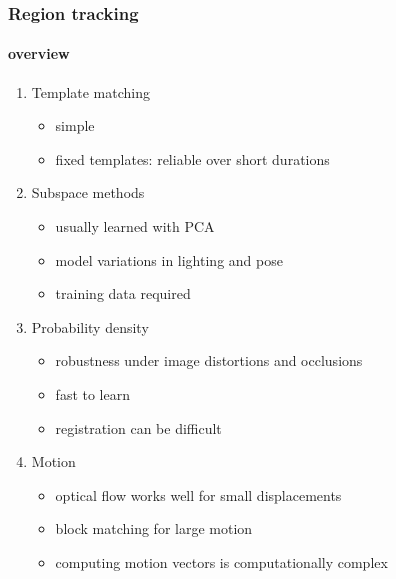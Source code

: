 \begin{frame}
\frametitle{Region tracking}
\framesubtitle{overview}
\mypagenum
	\begin{enumerate}
		\item Template matching
			\begin{itemize}
				\item simple
				\item fixed templates: reliable over short durations 
			\end{itemize}
		\item Subspace methods
			\begin{itemize}
				\item usually learned with PCA
				\item model variations in lighting and pose
				\item training data required
			\end{itemize}			
		\item Probability density
			\begin{itemize}
				\item robustness under image distortions and occlusions
				\item fast to learn
				\item registration can be difficult
			\end{itemize}
		\item Motion
			\begin{itemize}
				\item optical flow works well for small displacements
				\item block matching for large motion
				\item computing motion vectors is computationally complex
			\end{itemize}
	\end{enumerate}
\end{frame}





